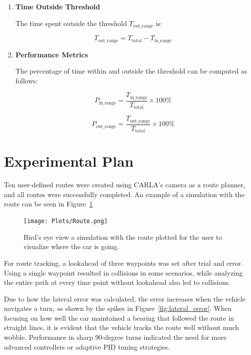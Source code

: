 \documentclass[conference]{IEEEtran}
\begin{document}
\begin{enumerate}
    \item \textbf{Time Outside Threshold}

    The time spent outside the threshold $T_{\text{out\_range}}$ is:

    \begin{equation}
    T_{\text{out\_range}} = T_{\text{total}} - T_{\text{in\_range}}
    \end{equation}

    \item \textbf{Performance Metrics}

    The percentage of time within and outside the threshold can be computed as follows:

    \begin{equation}
    P_{\text{in\_range}} = \frac{T_{\text{in\_range}}}{T_{\text{total}}} \times 100\%
    \end{equation}

    \begin{equation}
    P_{\text{out\_range}} = \frac{T_{\text{out\_range}}}{T_{\text{total}}} \times 100\%
    \end{equation}

\end{enumerate}

\section{Experimental Plan}

Ten user-defined routes were created using CARLA's camera as a route planner, and all routes were successfully completed. An example of a simulation with the route can be seen in Figure~\ref{fig:route}

\begin{figure}[h]
    \centering
    \texttt{[image: Plots/Route.png]}
    \caption{Bird's eye view a simulation with the route plotted for the user to visualize where the car is going.}
    \label{fig:route}
\end{figure}

For route tracking, a lookahead of three waypoints was set after trial and error. Using a single waypoint resulted in collisions in some scenarios, while analyzing the entire path at every time point without lookahead also led to collisions.

Due to how the lateral error was calculated, the error increases when the vehicle navigates a turn, as shown by the spikes in Figure~\ref{fig:lateral_error}. When focusing on how well the car maintained a bearing that followed the route in straight lines, it is evident that the vehicle tracks the route well without much wobble. Performance in sharp 90-degree turns indicated the need for more advanced controllers or adaptive PID tuning strategies.
\end{document}
